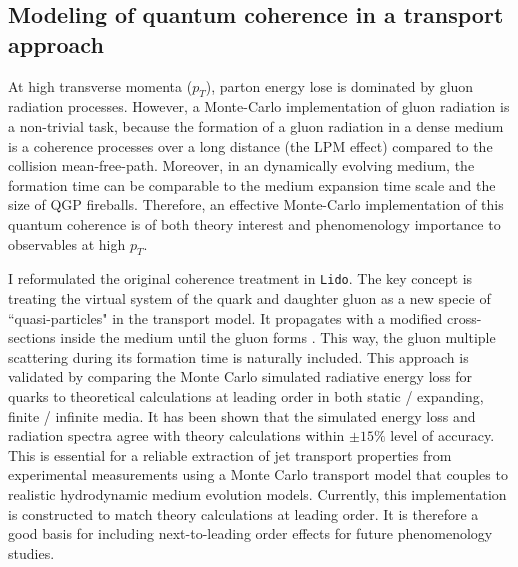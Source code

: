 \documentclass[12pt,a4paper]{article}
\begin{document}
\subsection{Modeling of quantum coherence in a transport approach}
At high transverse momenta ($p_T$), parton energy lose is dominated by gluon radiation processes. However, a Monte-Carlo implementation of gluon radiation is a non-trivial task, because the formation of a gluon radiation in a dense medium is a coherence processes over a long distance (the LPM effect) compared to the collision mean-free-path. 
Moreover, in an dynamically evolving medium, the formation time can be comparable to the medium expansion time scale and the size of QGP fireballs. 
Therefore, an effective Monte-Carlo implementation of this quantum coherence is of both theory interest and phenomenology importance to observables at high $p_T$.

I reformulated the original coherence treatment in {\tt Lido}.
The key concept is treating the virtual system of the quark and daughter gluon as a new specie of ``quasi-particles" in the transport model. 
It propagates with a modified cross-sections inside the medium until the gluon forms \cite{Ke:2018jem}. 
This way, the gluon multiple scattering during its formation time is naturally included.
This approach is validated by comparing the Monte Carlo simulated radiative energy loss for quarks to theoretical calculations at leading order in both static / expanding, finite / infinite media. 
It has been shown that the simulated energy loss and radiation spectra agree with theory calculations within $\pm 15\%$ level of accuracy. 
This is essential for a reliable extraction of jet transport properties from experimental measurements using a Monte Carlo transport model that couples to realistic hydrodynamic medium evolution models.
Currently, this implementation is constructed to match theory calculations at leading order. 
It is therefore a good basis for including next-to-leading order effects for future phenomenology studies.
\end{document}
